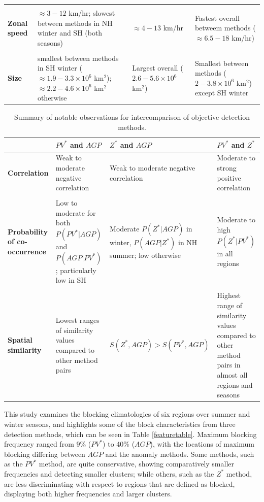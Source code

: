 \documentclass[smallextended]{svjour3}       %
\numberwithin{equation}{section}
\begin{document}
\begin{table}
\begin{tabular}[t]{|L{0.18\textwidth}|L{0.27\textwidth}|L{0.27\textwidth}|L{0.27\textwidth}|}
&&&\\
\textbf{Zonal speed}
& $\approx 3-12$ km/hr; slowest between methods in NH winter and SH (both seasons)
& $\approx 4-13$ km/hr
& Fastest overall betweem methods ($\approx6.5-18$ km/hr)\\
&&&\\
\textbf{Size}
& smallest between methods in SH winter ($\approx 1.9-3.3\times 10^6$ km$^2$); $\approx 2.2-4.6\times 10^6$ km$^2$ otherwise
& Largest overall ($2.6-5.6\times 10^6$ km$^2$)
& Smallest between methods ($2-3.8\times 10^6$ km$^2$) except SH winter\\
\hline
\end{tabular}
\end{table}

\begin{table}
\caption{Summary of notable observations for intercomparison of objective detection methods.} \label{inttable}
\begin{tabular}[t]{|L{0.18\textwidth}|L{0.27\textwidth}|L{0.27\textwidth}|L{0.27\textwidth}|}\hline
 &$PV^*$ and $AGP$& $Z^*$ and $AGP$ & $PV^*$ and $Z^*$\\
\hline
\textbf{Correlation }
& Weak to moderate negative correlation
& Weak to moderate negative correlation
& Moderate to strong positive correlation\\
&&&\\
\textbf{Probability of co-occurrence}
& Low to moderate for both $P(PV^*|AGP)$ and $P(AGP|PV^*)$; particularly low in SH
& Moderate $P(Z^*|AGP)$ in winter, $P(AGP|Z^*)$ in NH summer; low otherwise
& Moderate to high $P(Z^*|PV^*)$ in all regions\\
&&&\\
\textbf{Spatial similarity}
& Lowest ranges of similarity values compared to other method pairs
& $S(Z^*,AGP)>S(PV^*,AGP)$
&Highest range of similarity values compared to other method pairs in almost all regions and seasons\\

\hline
\end{tabular}
\end{table}

This study examines the blocking climatologies of six regions over summer and winter seasons, and highlights some of the block characteristics from three detection methods, which can be seen in Table \ref{featuretable}. Maximum blocking frequency ranged from 9\% ($PV^*$) to 40\% ($AGP$), with the locations of maximum blocking differing between $AGP$ and the anomaly methods. Some methods, such as the $PV^*$ method, are quite conservative, showing comparatively smaller frequencies and detecting smaller clusters; while others, such as the $Z^*$ method, are less discriminating with respect to regions that are defined as blocked, displaying both higher frequencies and larger clusters. 
\end{document}

